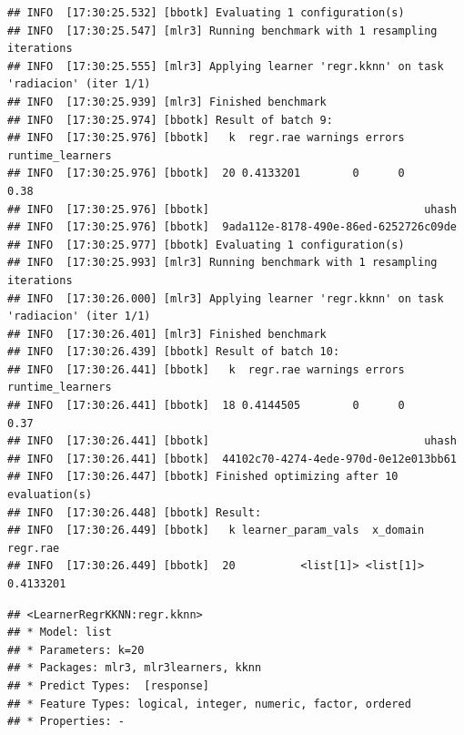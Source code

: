 \documentclass[
  11pt,
  a4paper,
]{article}
\newenvironment{Shaded}{\begin{snugshade}}{\end{snugshade}}
\newcommand{\CommentTok}[1]{\textcolor[rgb]{0.56,0.35,0.01}{\textit{#1}}}
\newcommand{\DecValTok}[1]{\textcolor[rgb]{0.00,0.00,0.81}{#1}}
\newcommand{\FunctionTok}[1]{\textcolor[rgb]{0.00,0.00,0.00}{#1}}
\newcommand{\NormalTok}[1]{#1}
\newcommand{\OtherTok}[1]{\textcolor[rgb]{0.56,0.35,0.01}{#1}}
\newcommand{\SpecialCharTok}[1]{\textcolor[rgb]{0.00,0.00,0.00}{#1}}
\begin{document}
\begin{verbatim}
## INFO  [17:30:25.532] [bbotk] Evaluating 1 configuration(s)
## INFO  [17:30:25.547] [mlr3] Running benchmark with 1 resampling iterations
## INFO  [17:30:25.555] [mlr3] Applying learner 'regr.kknn' on task 'radiacion' (iter 1/1)
## INFO  [17:30:25.939] [mlr3] Finished benchmark
## INFO  [17:30:25.974] [bbotk] Result of batch 9:
## INFO  [17:30:25.976] [bbotk]   k  regr.rae warnings errors runtime_learners
## INFO  [17:30:25.976] [bbotk]  20 0.4133201        0      0             0.38
## INFO  [17:30:25.976] [bbotk]                                 uhash
## INFO  [17:30:25.976] [bbotk]  9ada112e-8178-490e-86ed-6252726c09de
## INFO  [17:30:25.977] [bbotk] Evaluating 1 configuration(s)
## INFO  [17:30:25.993] [mlr3] Running benchmark with 1 resampling iterations
## INFO  [17:30:26.000] [mlr3] Applying learner 'regr.kknn' on task 'radiacion' (iter 1/1)
## INFO  [17:30:26.401] [mlr3] Finished benchmark
## INFO  [17:30:26.439] [bbotk] Result of batch 10:
## INFO  [17:30:26.441] [bbotk]   k  regr.rae warnings errors runtime_learners
## INFO  [17:30:26.441] [bbotk]  18 0.4144505        0      0             0.37
## INFO  [17:30:26.441] [bbotk]                                 uhash
## INFO  [17:30:26.441] [bbotk]  44102c70-4274-4ede-970d-0e12e013bb61
## INFO  [17:30:26.447] [bbotk] Finished optimizing after 10 evaluation(s)
## INFO  [17:30:26.448] [bbotk] Result:
## INFO  [17:30:26.449] [bbotk]   k learner_param_vals  x_domain  regr.rae
## INFO  [17:30:26.449] [bbotk]  20          <list[1]> <list[1]> 0.4133201
\end{verbatim}

\begin{Shaded}
\end{Shaded}

\begin{verbatim}
## <LearnerRegrKKNN:regr.kknn>
## * Model: list
## * Parameters: k=20
## * Packages: mlr3, mlr3learners, kknn
## * Predict Types:  [response]
## * Feature Types: logical, integer, numeric, factor, ordered
## * Properties: -
\end{verbatim}
\end{document}
